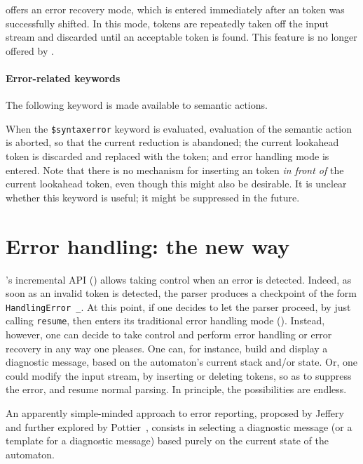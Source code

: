 \documentclass[onecolumn,11pt,nocopyrightspace,preprint]{sigplanconf}
\begin{document}
\ocamlyacc offers an error recovery mode, which is entered immediately after
an \error token was successfully shifted. In this mode, tokens are repeatedly
taken off the input stream and discarded until an acceptable token is found.
This feature is no longer offered by \menhir.

\paragraph{Error-related keywords}

The following keyword is made available to semantic actions.

When the \verb+$syntaxerror+ keyword is evaluated, evaluation of the semantic
action is aborted, so that the current reduction is abandoned; the current
lookahead token is discarded and replaced with the \error token; and error
handling mode is entered.  Note that there is no mechanism for inserting an
\error token \emph{in front of} the current lookahead token, even though this
might also be desirable.  It is unclear whether this keyword is useful; it
might be suppressed in the future.


\section{Error handling: the new way}
\label{sec:errors:new}

\menhir's incremental API () allows taking control when
an error is detected. Indeed, as soon as an invalid token is detected, the
parser produces a checkpoint of the form \verb+HandlingError _+. At this
point, if one decides to let the parser proceed, by just
calling \verb+resume+, then \menhir enters its traditional error handling mode
(). Instead, however, one can decide to take control and
perform error handling or error recovery in any way one pleases. One can, for
instance, build and display a diagnostic message, based on the automaton's
current stack and/or state. Or, one could modify the input stream, by
inserting or deleting tokens, so as to suppress the error, and resume normal
parsing. In principle, the possibilities are endless.

An apparently simple-minded approach to error reporting,
proposed by Jeffery~\citeyear{jeffery-03} and further explored by
Pottier~\citeyear{pottier-reachability-cc-2016}, consists in selecting a diagnostic
message (or a template for a diagnostic message) based purely on the current
state of the automaton.
\end{document}
